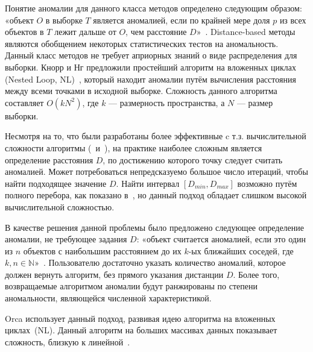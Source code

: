 Понятие аномалии для данного класса методов определено следующим образом: «объект $O$ в выборке $T$ является аномалией, если по крайней мере доля $p$ из всех объектов в $T$ лежит дальше от $O$, чем расстояние $D$»~\cite{KnorrNgDistBasedAlgorithms}. Distance-based методы являются обобщением некоторых статистических тестов на аномальность. Данный класс методов не требует априорных знаний о виде распределения для выборки. Кнорр и Нг предложили простейший алгоритм на вложенных циклах (Nested Loop, NL)~\cite{KnorrNgDistBasedAlgorithms}, который находит аномалии путём вычисления расстояния между всеми точками в исходной выборке. Сложность данного алгоритма составляет $O(kN^2)$, где $k$ --- размерность пространства, а $N$ --- размер выборки.

Несмотря на то, что были разработаны более эффективные c т.з. вычислительной сложности алгоритмы (\cite{TaoMiningDistBasedOutliersFromLargeDB}~и~\cite{AngiulliVeryEfficientMiningDistBasedOutliers}), на практике наиболее сложным является определение расстояния $D$, по достижению которого точку следует считать аномалией. Может потребоваться непредсказуемо большое число итераций, чтобы найти подходящее значение $D$. Найти интервал $[D_{min}, D_{max}]$ возможно путём полного перебора, как показано в~\cite{TaoMiningDistBasedOutliersFromLargeDB}, но данный подход обладает слишком высокой вычислительной сложностью.

В качестве решения данной проблемы было предложено следующее определение аномалии, не требующее задания $D$: «объект считается аномалией, если это один из $n$ объектов с наибольшим расстоянием до их $k$-ых ближайших соседей, где~$k,n\in\mathbb{N}$»~\cite{RamaswamyEffAlgoMiningOutliers}. Пользователю достаточно указать количество аномалий, которое должен вернуть алгоритм, без прямого указания дистанции $D$. Более того, возвращаемые алгоритмом аномалии будут ранжированы по степени аномальности, являющейся численной характеристикой.

Orca использует данный подход, развивая идею алгоритма на вложенных циклах~(NL). Данный алгоритм на больших массивах данных показывает сложность, близкую к линейной~\cite{BaySchwabacherOrca}.

